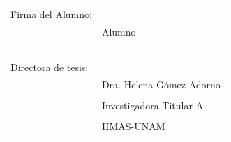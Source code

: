 \documentclass{article}
\begin{document}
\begin{tabular}{@{}p{6cm}p{7cm}@{}}
    \Large{Firma del Alumno:} & \hrulefill \\
                         & \large{Alumno} \par \\
    \\    \\    \\    \\    \\    
    \Large{Directora de tesis:} & \hrulefill \\
                         & \large{Dra. Helena Gómez Adorno} \\
    \Large{} & \\
                         & \large{Investigadora Titular A} \\
    \Large{} &  \\
                         & \large{IIMAS-UNAM} \\
    
\end{tabular}
\end{document}
